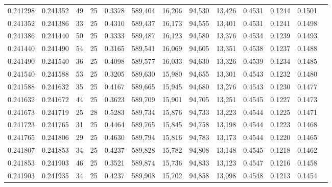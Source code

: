 \begin{tabular}{rrrrrrrrrrrrr}
0.241298 & 0.241352 &    49 &  25 &                                     0.3378 & 589,404 &  16,206 &  94,530 &  13,426 & 0.4531 & 0.1244 & 0.1501 \\
0.241352 & 0.241386 &    33 &  25 &                                     0.4310 & 589,437 &  16,173 &  94,555 &  13,401 & 0.4531 & 0.1241 & 0.1498 \\
0.241386 & 0.241440 &    50 &  25 &                                     0.3333 & 589,487 &  16,123 &  94,580 &  13,376 & 0.4534 & 0.1239 & 0.1493 \\
0.241440 & 0.241490 &    54 &  25 &                                     0.3165 & 589,541 &  16,069 &  94,605 &  13,351 & 0.4538 & 0.1237 & 0.1488 \\
0.241490 & 0.241540 &    36 &  25 &                                     0.4098 & 589,577 &  16,033 &  94,630 &  13,326 & 0.4539 & 0.1234 & 0.1485 \\
0.241540 & 0.241588 &    53 &  25 &                                     0.3205 & 589,630 &  15,980 &  94,655 &  13,301 & 0.4543 & 0.1232 & 0.1480 \\
0.241588 & 0.241632 &    35 &  25 &                                     0.4167 & 589,665 &  15,945 &  94,680 &  13,276 & 0.4543 & 0.1230 & 0.1477 \\
0.241632 & 0.241672 &    44 &  25 &                                     0.3623 & 589,709 &  15,901 &  94,705 &  13,251 & 0.4545 & 0.1227 & 0.1473 \\
0.241673 & 0.241719 &    25 &  28 &                                     0.5283 & 589,734 &  15,876 &  94,733 &  13,223 & 0.4544 & 0.1225 & 0.1471 \\
0.241723 & 0.241765 &    31 &  25 &                                     0.4464 & 589,765 &  15,845 &  94,758 &  13,198 & 0.4544 & 0.1223 & 0.1468 \\
0.241765 & 0.241806 &    29 &  25 &                                     0.4630 & 589,794 &  15,816 &  94,783 &  13,173 & 0.4544 & 0.1220 & 0.1465 \\
0.241807 & 0.241853 &    34 &  25 &                                     0.4237 & 589,828 &  15,782 &  94,808 &  13,148 & 0.4545 & 0.1218 & 0.1462 \\
0.241853 & 0.241903 &    46 &  25 &                                     0.3521 & 589,874 &  15,736 &  94,833 &  13,123 & 0.4547 & 0.1216 & 0.1458 \\
0.241903 & 0.241935 &    34 &  25 &                                     0.4237 & 589,908 &  15,702 &  94,858 &  13,098 & 0.4548 & 0.1213 & 0.1454 \\

\end{tabular}
